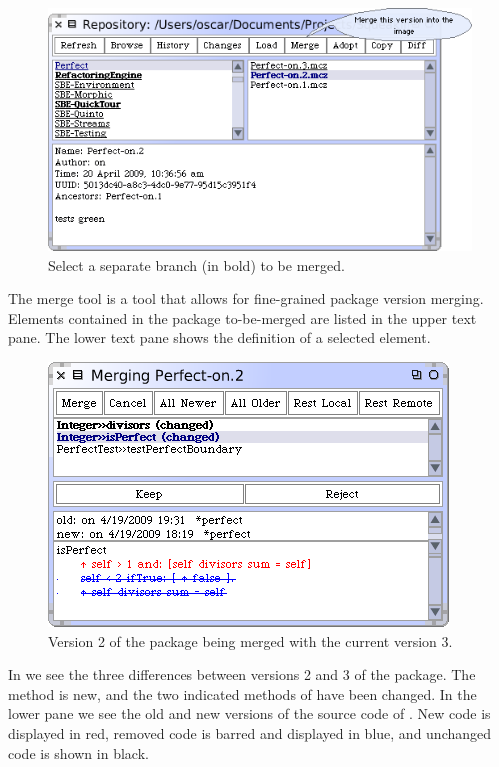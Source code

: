 \documentclass[a4paper,10pt,twoside]{book}
\begin{document}



\begin{figure}[ht]\centering
	\includegraphics[width=.60\textwidth]{mergeButton}
	\caption{Select a separate branch (in bold) to be merged.}
\end{figure}


The merge tool is a tool that allows for fine-grained package version merging. Elements contained in the package to-be-merged are listed in the upper text pane. The lower text pane shows the definition of a selected element. 

\begin{figure}[ht]\centering
	\includegraphics[width=.55\textwidth]{mergeTool}
	\caption{Version 2 of the  package being merged with the current version 3.
	}
\end{figure}

In  we see the three differences between versions 2 and 3 of the  package. The method  is new, and the two indicated methods of  have been changed. In the lower pane we see the old and new versions of the source code of .
New code is displayed in red, removed code is barred and displayed in blue, and unchanged code is shown in black. 
\end{document}
